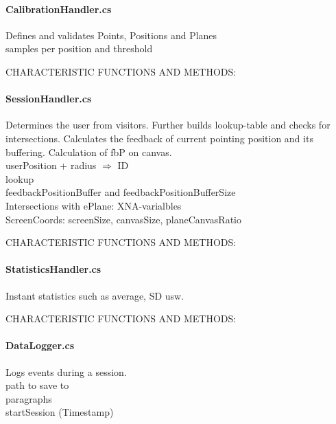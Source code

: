 
\paragraph{CalibrationHandler.cs} Defines and validates Points, Positions and Planes
\\
samples per position and threshold

CHARACTERISTIC FUNCTIONS AND METHODS: 


\paragraph{SessionHandler.cs} Determines the user from visitors. Further builds lookup-table and checks for intersections. Calculates the feedback of current pointing position and its buffering. Calculation of fbP on canvas.
\\
userPosition + radius $\Rightarrow$ ID
\\
lookup
\\
feedbackPositionBuffer and feedbackPositionBufferSize
\\
Intersections with ePlane: XNA-varialbles
\\
ScreenCoords: screenSize, canvasSize, planeCanvasRatio

CHARACTERISTIC FUNCTIONS AND METHODS: 


\paragraph{StatisticsHandler.cs} Instant statistics such as average, SD usw. 

CHARACTERISTIC FUNCTIONS AND METHODS: 


\paragraph{DataLogger.cs} Logs events during a session.
\\
path to save to
\\
paragraphs
\\
startSession (Timestamp)

